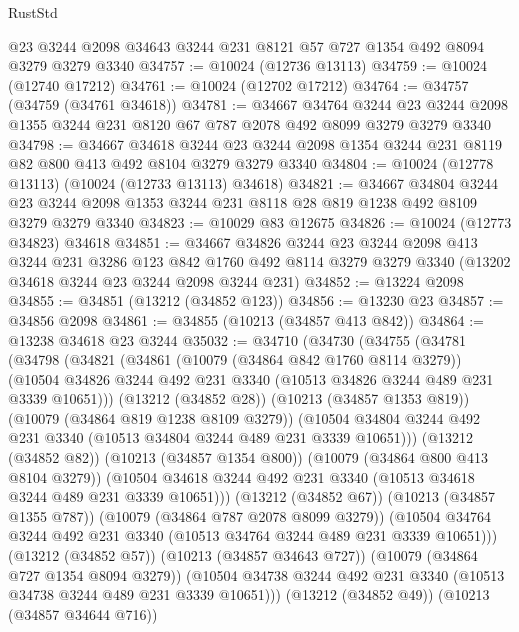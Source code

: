 \begin{lexlean}{RustStd}
\begin{coremodule}
{\begin{coremodule}
{{{{{{{{{{{{{{{{{{{{{{{{{{    @23
    @3244
    @2098
    @34643
    @3244
    @231
    @8121
    @57
    @727
    @1354
    @492
    @8094
    @3279
    @3279
    @3340
@34757 := @10024 (@12736 @13113)
@34759 := @10024 (@12740 @17212)
@34761 := @10024 (@12702 @17212)
@34764 := @34757 (@34759 (@34761 @34618))
@34781 := @34667
    @34764
    @3244
    @23
    @3244
    @2098
    @1355
    @3244
    @231
    @8120
    @67
    @787
    @2078
    @492
    @8099
    @3279
    @3279
    @3340
@34798 := @34667
    @34618
    @3244
    @23
    @3244
    @2098
    @1354
    @3244
    @231
    @8119
    @82
    @800
    @413
    @492
    @8104
    @3279
    @3279
    @3340
@34804 := @10024 (@12778 @13113) (@10024 (@12733 @13113) @34618)
@34821 := @34667
    @34804
    @3244
    @23
    @3244
    @2098
    @1353
    @3244
    @231
    @8118
    @28
    @819
    @1238
    @492
    @8109
    @3279
    @3279
    @3340
@34823 := @10029 @83 @12675
@34826 := @10024 (@12773 @34823) @34618
@34851 := @34667
    @34826
    @3244
    @23
    @3244
    @2098
    @413
    @3244
    @231
    @3286
    @123
    @842
    @1760
    @492
    @8114
    @3279
    @3279
    @3340
    (@13202 @34618 @3244 @23 @3244 @2098 @3244 @231)
@34852 := @13224 @2098
@34855 := @34851 (@13212 (@34852 @123))
@34856 := @13230 @23
@34857 := @34856 @2098
@34861 := @34855 (@10213 (@34857 @413 @842))
@34864 := @13238 @34618 @23 @3244
@35032 := @34710
    (@34730
      (@34755
        (@34781
          (@34798
            (@34821
              (@34861
                (@10079 (@34864 @842 @1760 @8114 @3279))
                (@10504 @34826 @3244 @492 @231 @3340 (@10513 @34826 @3244 @489 @231 @3339 @10651)))
              (@13212 (@34852 @28))
              (@10213 (@34857 @1353 @819))
              (@10079 (@34864 @819 @1238 @8109 @3279))
              (@10504 @34804 @3244 @492 @231 @3340 (@10513 @34804 @3244 @489 @231 @3339 @10651)))
            (@13212 (@34852 @82))
            (@10213 (@34857 @1354 @800))
            (@10079 (@34864 @800 @413 @8104 @3279))
            (@10504 @34618 @3244 @492 @231 @3340 (@10513 @34618 @3244 @489 @231 @3339 @10651)))
          (@13212 (@34852 @67))
          (@10213 (@34857 @1355 @787))
          (@10079 (@34864 @787 @2078 @8099 @3279))
          (@10504 @34764 @3244 @492 @231 @3340 (@10513 @34764 @3244 @489 @231 @3339 @10651)))
        (@13212 (@34852 @57))
        (@10213 (@34857 @34643 @727))
        (@10079 (@34864 @727 @1354 @8094 @3279))
        (@10504 @34738 @3244 @492 @231 @3340 (@10513 @34738 @3244 @489 @231 @3339 @10651)))
      (@13212 (@34852 @49))
      (@10213 (@34857 @34644 @716))
}}}}}}}}}}}}}}}}}}}}}}}}}}
\end{coremodule}}
\end{coremodule}
\end{lexlean}
